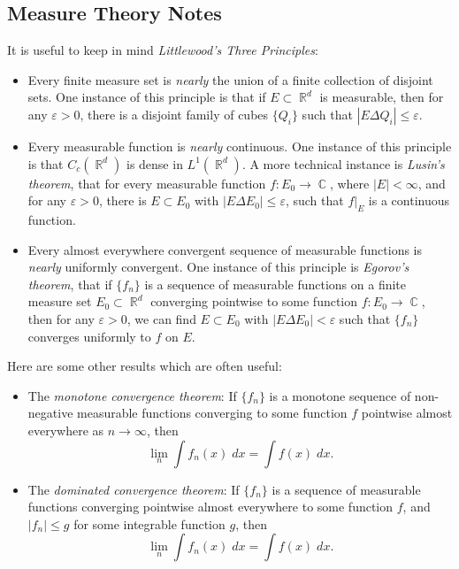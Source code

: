 \documentclass[answers]{exam}
\DeclareMathOperator{\CC}{\mathbb{C}}
\DeclareMathOperator{\RR}{\mathbb{R}}
\begin{document}
\begin{questions}
\newpage
\section{Measure Theory Notes}

It is useful to keep in mind \emph{Littlewood's Three Principles}:
%
\begin{itemize}
	\item Every finite measure set is \emph{nearly} the union of a finite collection of disjoint sets. One instance of this principle is that if $E \subset \RR^d$ is measurable, then for any $\varepsilon > 0$, there is a disjoint family of cubes $\{ Q_i \}$ such that $|E \Delta Q_i| \leq \varepsilon$.

	\item Every measurable function is \emph{nearly} continuous. One instance of this principle is that $C_c(\RR^d)$ is dense in $L^1(\RR^d)$. A more technical instance is \emph{Lusin's theorem}, that for every measurable function $f: E_0 \to \CC$, where $|E| < \infty$, and for any $\varepsilon > 0$, there is $E \subset E_0$ with $|E \Delta E_0| \leq \varepsilon$, such that $f|_E$ is a continuous function.

	\item Every almost everywhere convergent sequence of measurable functions is \emph{nearly} uniformly convergent. One instance of this principle is \emph{Egorov's theorem}, that if $\{ f_n \}$ is a sequence of measurable functions on a finite measure set $E_0 \subset \RR^d$ converging pointwise to some function $f: E_0 \to \CC$, then for any $\varepsilon > 0$, we can find $E \subset E_0$ with $|E \Delta E_0| < \varepsilon$ such that $\{ f_n \}$ converges uniformly to $f$ on $E$.
\end{itemize}
%
Here are some other results which are often useful:
%
\begin{itemize}
	\item The \emph{monotone convergence theorem}: If $\{ f_n \}$ is a monotone sequence of non-negative measurable functions converging to some function $f$ pointwise almost everywhere as $n \to \infty$, then
	\[ \lim_n \int f_n(x)\; dx = \int f(x)\; dx. \]

	\item The \emph{dominated convergence theorem}: If $\{ f_n \}$ is a sequence of measurable functions converging pointwise almost everywhere to some function $f$, and $|f_n| \leq g$ for some integrable function $g$, then
	\[ \lim_n \int f_n(x)\; dx = \int f(x)\; dx. \]


\end{itemize}
\end{questions}
\end{document}

